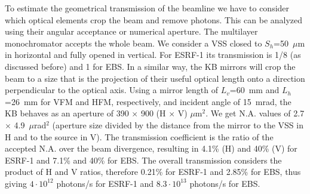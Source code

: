 \documentclass{iucr}              %
\newcommand{\todo}[1]{{\color{red}[TODO: "#1'']}}
\begin{document}
To estimate the geometrical transmission of the beamline we have to consider which optical elements crop the beam and remove photons. This can be analyzed using their angular acceptance or numerical aperture. The multilayer monochromator accepts the whole beam. We consider a VSS closed to $S_h$=50~$\mu$m in horizontal and fully opened in vertical. For ESRF-1 its transmission is 1/8 (as discussed before) and 1 for EBS. In a similar way, the KB mirrors will crop the beam to a size that is the projection of their useful optical length onto a direction perpendicular to the optical axis. Using a mirror length of $L_v$=60~mm and $L_h$=26~mm for VFM and HFM, respectively, and incident angle of 15~mrad, the KB behaves as an aperture of  390 $\times$ 900 (H $\times$ V) $\mu$m$^2$. 
We get N.A. values of 2.7 $\times$ 4.9~$\mu$rad$^2$ (aperture size divided by the distance from the mirror to the VSS in H and to the source in V). The transmission coefficient is the ratio of the accepted N.A. over the beam divergence, resulting in 
4.1\% (H) and 40\% (V) for ESRF-1 and 7.1\% and 40\% for EBS. The overall transmission considers the product of H and V ratios, therefore 
0.21\% for ESRF-1 and 2.85\% for EBS, thus giving 
$4\cdot10^{12}$ photons/s for ESRF-1 and $8.3\cdot10^{13}$ photons/s for EBS. 
\end{document}
